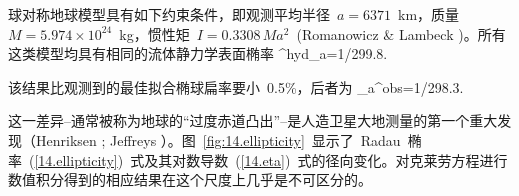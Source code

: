 球对称地球模型具有如下约束条件，即观测平均半径~$a=6371$~km，质量~$M=5.974\times 10^{24}$~kg，惯性矩~$I=0.3308\,Ma^2$~(Romanowicz \& Lambeck
\citeyear{romanowicz&lambeck77})。所有这类模型均具有相同的流体静力学表面椭率
\eq \label{14.hydreps}
\eps^{\rm hyd}_a=1/299.8.
\en

该结果比观测到的最佳拟合椭球扁率要小~0.5\%，后者为
\eq \label{14.besteps}
\eps_a^{\rm obs}=1/298.3.
\en

这一差异--通常被称为地球的“过度赤道凸出”--是人造卫星大地测量的第一个重大发现（Henriksen \citeyear{henriksen60}; Jeffreys \citeyear{jeffreys63}）。图~\ref{fig:14.ellipticity}~显示了~Radau~椭率~(\ref{14.ellipticity})~式及其对数导数~(\ref{14.eta})~式的径向变化。对克莱劳方程进行数值积分得到的相应结果在这个尺度上几乎是不可区分的。
%
